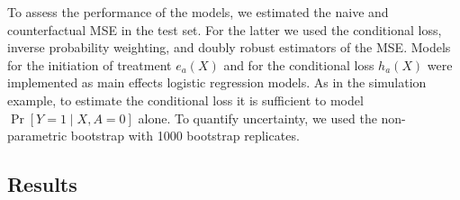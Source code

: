 To assess the performance of the models, we estimated the naive and counterfactual MSE in the test set. For the latter we used the conditional loss, inverse probability weighting, and doubly robust estimators of the MSE. Models for the initiation of treatment $e_a(X)$ and for the conditional loss $h_a(X)$ were implemented as main effects logistic regression models. As in the simulation example, to estimate the conditional loss it is sufficient to model $\operatorname{Pr}[Y=1 \mid X, A=0]$ alone. To quantify uncertainty, we used the non-parametric bootstrap with 1000 bootstrap replicates.

\subsection{Results}

\begin{table}[t]
    \centering
    \caption{Estimated MSE in a statin-naive population for two prediction models using emulated trial data from MESA.}

\end{table}
